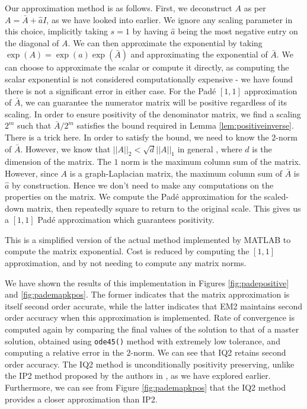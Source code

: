 Our approximation method is as follows.
First, we deconstruct $A$ as per $A = \bar{A} + \hat{a}I$, as we have looked into earlier.
We ignore any scaling parameter in this choice, implicitly taking $s=1$ by having $\hat{a}$ being the most negative entry on the diagonal of $A$.
We can then approximate the exponential by taking $\exp(A) = \exp(a)\exp(\bar{A})$ and approximating the exponential of $\bar{A}$.
We can choose to approximate the scalar or compute it directly, as computing the scalar exponential is not considered computationally expensive - we have found there is not a significant error in either case.
For the Pad\'e $[1,1]$ approximation of $\bar{A}$, we can guarantee the numerator matrix will be positive regardless of its scaling.
In order to ensure positivity of the denominator matrix, we find a scaling $2^m$ such that $\bar{A}/2^m$ satisfies the bound required in Lemma \ref{lem:positiveinverse}.
There is a trick here. In order to satisfy the bound, we need to know the $2$-norm of $\bar{A}$.
However, we know that $||A||_2 < \sqrt{d}||A||_1$ in general \cite{horn2012matrix}, where $d$ is the dimension of the matrix.
The $1$ norm is the maximum column sum of the matrix. However, since $A$ is a graph-Laplacian matrix, the maximum column sum of $\bar{A}$ is $\hat{a}$ by construction.
Hence we don't need to make any computations on the properties on the matrix.
We compute the Pad\'e approximation for the scaled-down matrix, then repeatedly square to return to the original scale.
This gives us a $[1,1]$ Pad\'e approximation which guarantees positivity.

This is a simplified version of the actual method implemented by MATLAB to compute the matrix exponential.
Cost is reduced by computing the $[1,1]$ approximation,
and by not needing to compute any matrix norms.

We have shown the results of this implementation in Figures \ref{fig:padepositive} and \ref{fig:pademapkpos}.
The former indicates that the matrix approximation is itself second order accurate,
while the latter indicates that EM2 maintains second order accuracy when this approximation is implemented.
Rate of convergence is computed again by comparing the final values of the solution to that of a master solution, obtained using \texttt{ode45()} method with extremely low tolerance,
and computing a relative error in the $2$-norm.
We can see that IQ2 retains second order accuracy.
The IQ2 method is unconditionally positivity preserving, unlike the IP2 method proposed by the authors in \cite{blanes_pos_2022}, as we have explored earlier.
Furthermore, we can see from Figure \ref{fig:pademapkpos} that the IQ2 method provides a closer approximation than IP2.

